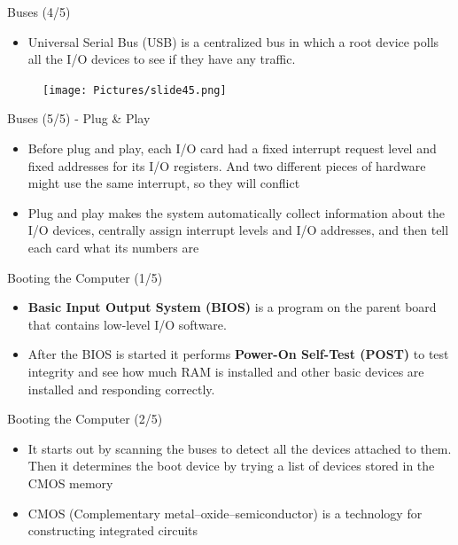 \documentclass{beamer}
\begin{document}
\begin{frame}
{\centerline{Buses (4/5)}}
\begin{itemize}
    \item Universal Serial Bus (USB) is a centralized bus in which a root device polls all the I/O devices to see if they have any traffic.
\end{itemize}
\begin{figure}
    \centering
    \texttt{[image: Pictures/slide45.png]}
\end{figure}
\end{frame}

\begin{frame}
{\centerline{Buses (5/5) - Plug \& Play}}
\begin{itemize}
    \item Before plug and play, each I/O card had a fixed interrupt request level and fixed addresses for its I/O registers. And two different pieces of hardware might use the same interrupt, so they will conflict
    \item Plug and play makes the system automatically collect information about the I/O devices, centrally assign interrupt levels and I/O addresses, and then tell each card what its numbers are
\end{itemize}
\end{frame}

\begin{frame}
{\centerline{Booting the Computer (1/5)}}
\begin{itemize}
    \item \textbf{Basic Input Output System (BIOS)} is a program on the parent board that contains low-level I/O software.
    \item After the BIOS is started it performs \textbf{Power-On Self-Test (POST)} to test integrity and see how much RAM is installed and other basic devices are installed and responding correctly.
\end{itemize}
\end{frame}

\begin{frame}
{\centerline{Booting the Computer (2/5)}}
\begin{itemize}
    \item It starts out by scanning the buses to detect all the devices attached to them. Then it determines the boot device by trying a list of devices stored in the CMOS memory
    \item CMOS (Complementary metal–oxide–semiconductor) is a technology for constructing integrated circuits
\end{itemize}
\end{frame}
\end{document}
